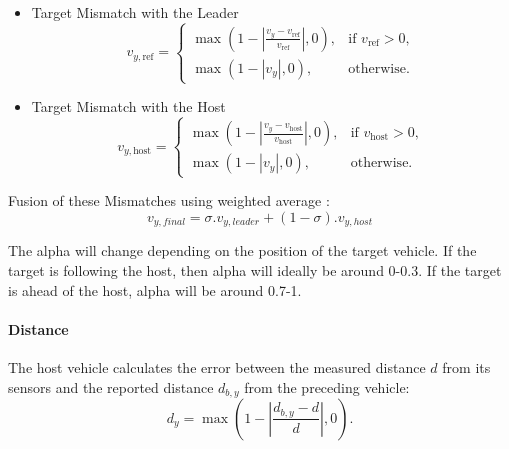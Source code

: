 \documentclass[letterpaper, 10pt, conference]{ieeeconf}  %
\begin{document}
\begin{itemize}
    \item Target Mismatch with the Leader
        \begin{equation}
        v_{y,\text{ref}} = 
        \begin{cases} 
            \max\left(1 - \left|\frac{v_y - v_\text{ref}}{v_\text{ref}}\right|, 0\right), & \text{if } v_\text{ref} > 0, \\
            \max\left(1 - |v_y|, 0\right), & \text{otherwise}.
        \end{cases}
    \end{equation}
    \item Target Mismatch with the Host
        \begin{equation}
            v_{y,\text{host}} = 
            \begin{cases} 
                \max\left(1 - \left|\frac{v_y - v_\text{host}}{v_\text{host}}\right|, 0\right), & \text{if } v_\text{host} > 0, \\
                \max\left(1 - |v_y|, 0\right), & \text{otherwise}.
            \end{cases}
        \end{equation}
\end{itemize}
Fusion of these Mismatches using weighted average :
\begin{equation}
    v_{y,final} = \sigma. v_{y,leader} + (1-\sigma). v_{y,host}     
\end{equation}

The alpha will change depending on the position of the target vehicle. If the target is following the host, then alpha will ideally be around 0-0.3. If the target is ahead of the host, alpha will be around 0.7-1.

\paragraph{Distance} The host vehicle calculates the error between the measured distance $d$ from its sensors and the reported distance $d_{b,y}$ from the preceding vehicle:
\begin{equation}
    d_y = \max\left(1 - \left|\frac{d_{b,y} - d}{d}\right|, 0\right).
\end{equation}
\end{document}
